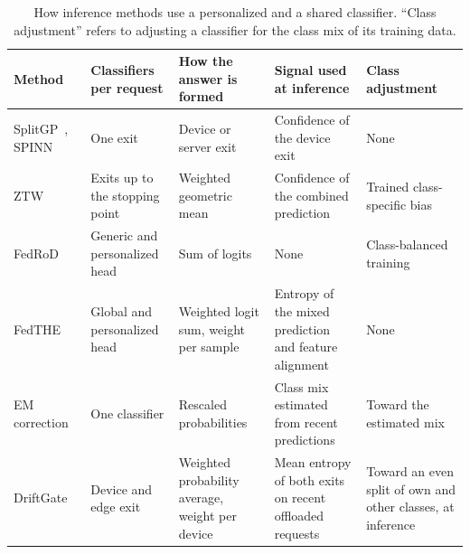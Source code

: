 \begin{table}[t]
\centering
\caption{How inference methods use a personalized and a shared classifier. ``Class adjustment'' refers to adjusting a classifier for the class mix of its training data.}
\label{tab:related}
\footnotesize
\begin{tabular}{>{\raggedright\arraybackslash}p{2.5cm}>{\raggedright\arraybackslash}p{2.6cm}>{\raggedright\arraybackslash}p{3.1cm}>{\raggedright\arraybackslash}p{3.7cm}>{\raggedright\arraybackslash}p{3.6cm}}
\toprule
Method & Classifiers per request & How the answer is formed & Signal used at inference & Class adjustment \\
\midrule
SplitGP~\cite{han2023splitgp}, SPINN~\cite{laskaridis2020spinn} & One exit & Device or server exit & Confidence of the device exit & None \\
ZTW~\cite{wolczyk2021ztw} & Exits up to the stopping point & Weighted geometric mean & Confidence of the combined prediction & Trained class-specific bias \\
FedRoD~\cite{chen2022fedrod} & Generic and personalized head & Sum of logits & None & Class-balanced training \\
FedTHE~\cite{jiang2023fedthe} & Global and personalized head & Weighted logit sum, weight per sample & Entropy of the mixed prediction and feature alignment & None \\
EM correction~\cite{saerens2002adjusting} & One classifier & Rescaled probabilities & Class mix estimated from recent predictions & Toward the estimated mix \\
DriftGate & Device and edge exit & Weighted probability average, weight per device & Mean entropy of both exits on recent offloaded requests & Toward an even split of own and other classes, at inference \\
\bottomrule
\end{tabular}
\end{table}

